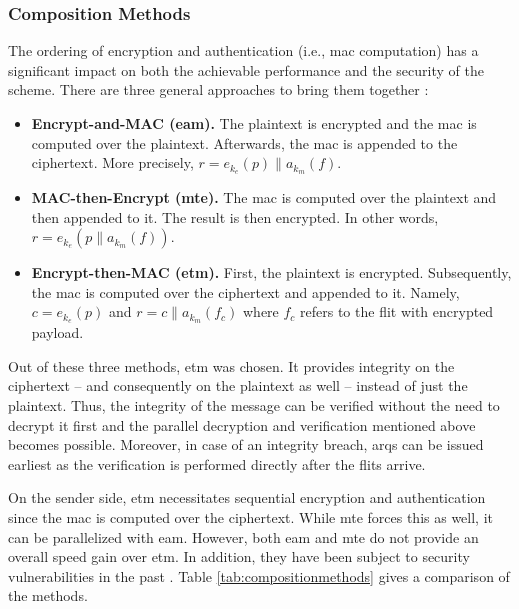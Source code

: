 \subsubsection{Composition Methods}
The ordering of encryption and authentication (i.e., \gls{mac} computation) has a significant impact on both the achievable performance and the
security of the scheme. There are three general approaches to bring them together \cite{bellare00authenc}:
\begin{itemize}
    \item \textbf{Encrypt-and-MAC (\gls{eam}).} The plaintext is encrypted and the \gls{mac} is computed over the plaintext. Afterwards, the \gls{mac} is
        appended to the ciphertext. More precisely, $r = e_{k_e}(p)\|a_{k_m}(f)$.
    \item \textbf{MAC-then-Encrypt (\gls{mte}).} The \gls{mac} is computed over the plaintext and then appended to it. The result is then
        encrypted. In other words, $r = e_{k_e}(p\|a_{k_m}(f))$.
    \item \textbf{Encrypt-then-MAC (\gls{etm}).} First, the plaintext is encrypted. Subsequently, the \gls{mac} is computed over the ciphertext and appended to it.
        Namely, $c = e_{k_e}(p)$ and $r = c\|a_{k_m}(f_c)$ where $f_c$ refers to the flit with encrypted payload.
\end{itemize}
\vspace{0.5\baselineskip}

Out of these three methods, \gls{etm} was chosen. It provides integrity on the ciphertext -- and consequently on the plaintext as well --
instead of just the plaintext. Thus, the integrity of the message can be verified without the need to decrypt it first and the parallel decryption and
verification mentioned above becomes possible. Moreover, in case of an integrity breach, \glspl{arq} can be issued earliest as the verification is
performed directly after the flits arrive.

On the sender side, \gls{etm} necessitates sequential encryption and authentication since the \gls{mac} is computed over the ciphertext. While
\gls{mte} forces this as well, it can be parallelized with \gls{eam}. However, both \gls{eam} and \gls{mte} do not provide an overall speed gain over
\gls{etm}. In addition, they have been subject to security vulnerabilities in the past \cites{bellare00authenc}{bellare04ssheam}{etmtls}. Table
\ref{tab:compositionmethods} gives a comparison of the methods.

